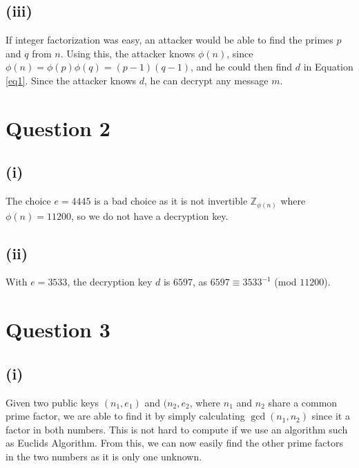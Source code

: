 \documentclass[a4paper, fleqn]{article}
\begin{document}
\subsection{(iii)}
If integer factorization was easy, an attacker would be able to find the primes $p$ and $q$ from $n$. Using this, the attacker knows $\phi(n)$, since $\phi(n)=\phi(p)\phi(q)=(p-1)(q-1)$, and he could then find $d$ in Equation \ref{eq1}. Since the attacker knows $d$, he can decrypt any message $m$.

\section{Question 2}
\subsection{(i)}
The choice $e=4445$ is a bad choice as it is not invertible $\mathbb{Z}_{\phi(n)}$ where $\phi(n)=11200$, so we do not have a decryption key.

\subsection{(ii)}
With $e=3533$, the decryption key $d$ is $6597$, as $6597\equiv 3533^{-1}$ (mod $11200$).

\section{Question 3}
\subsection{(i)}
Given two public keys $(n_1, e_1)$ and $(n_2, e_2$, where $n_1$ and $n_2$ share a common prime factor, we are able to find it by simply calculating $\gcd(n_1, n_2)$ since it a factor in both numbers. This is not hard to compute if we use an algorithm such as Euclids Algorithm. From this, we can now easily find the other prime factors in the two numbers as it is only one unknown.
\end{document}
